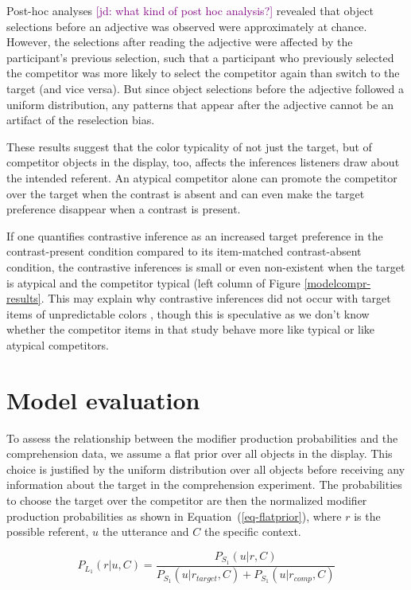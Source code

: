 \documentclass[10pt,letterpaper]{article}
\newcommand{\jd}[1]{\textcolor{Purple}{[jd: #1]}}
\newcommand{\figref}[1]{Figure \ref{#1}}
\begin{document}
Post-hoc analyses \jd{what kind of post hoc analysis?} revealed that object selections before an adjective was observed were approximately at chance. However, the selections after reading the adjective were affected by the participant's previous selection, such that a participant who previously selected the competitor was more likely to select the competitor again than switch to the target (and vice versa). But since object selections before the adjective followed a uniform distribution, any patterns that appear after the adjective cannot be an artifact of the reselection bias.

These results suggest  that the color typicality of not just the target, but of competitor objects in the display, too, affects the inferences listeners draw about the intended referent. An atypical competitor alone can promote the competitor over the target when the contrast is absent and can even make the target preference disappear when a contrast is present. %

If one quantifies  contrastive inference as an increased target preference in the contrast-present condition compared to its item-matched contrast-absent condition, the contrastive inferences is small or even non-existent when the target is atypical and the competitor typical (left column of \figref{modelcompr-results}. This may explain why contrastive inferences did not occur with target items of unpredictable colors \cite{Sedivy:2003}, though this is speculative as we don't know whether the competitor items in that study behave more like typical or like atypical competitors.

\section{Model evaluation}

To assess the relationship between the modifier production probabilities and the comprehension data, we assume a flat prior over all objects in the display. This choice is justified by the uniform distribution over all objects before receiving any information about the target in the comprehension experiment. The probabilities to choose the target over the competitor are then the normalized modifier production probabilities as shown in Equation~(\ref{eq-flatprior}), where $r$ is the possible referent, $u$ the utterance and $C$ the specific context.

\begin{equation}
	P_{L_1}(r|u,C) = \frac{P_{S_1}(u|r,C)}{P_{S_1}(u|r_{target},C) + P_{S_1}(u|r_{comp},C)}
\label{eq-flatprior}
\end{equation}
\end{document}
